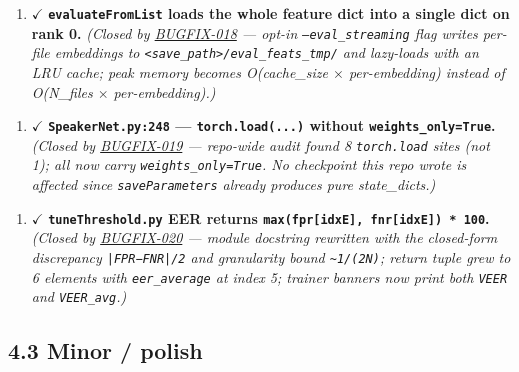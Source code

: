 \documentclass[10pt,a4paper]{article}
\begin{document}
\begin{enumerate}[leftmargin=*,itemsep=2pt]
  \item {\color{green!50!black}$\checkmark$} \textbf{\texttt{evaluateFromList} loads the whole feature dict into a single dict on rank 0.} \textit{(Closed by \href{docs/bugfixes/BUGFIX-018-streaming-evaluation.md}{BUGFIX-018} --- opt-in \texttt{--eval\_streaming} flag writes per-file embeddings to \texttt{<save\_path>/eval\_feats\_tmp/} and lazy-loads with an LRU cache; peak memory becomes O(cache\_size $\times$ per-embedding) instead of O(N\_files $\times$ per-embedding).)}
\end{enumerate}

\begin{enumerate}[leftmargin=*,itemsep=2pt]
  \item {\color{green!50!black}$\checkmark$} \textbf{\texttt{SpeakerNet.py:248} --- \texttt{torch.load(...)} without \texttt{weights\_only=True}.} \textit{(Closed by \href{docs/bugfixes/BUGFIX-019-torch-load-weights-only.md}{BUGFIX-019} --- repo-wide audit found 8 \texttt{torch.load} sites (not 1); all now carry \texttt{weights\_only=True}. No checkpoint this repo wrote is affected since \texttt{saveParameters} already produces pure state\_dicts.)}
\end{enumerate}

\begin{enumerate}[leftmargin=*,itemsep=2pt]
  \item {\color{green!50!black}$\checkmark$} \textbf{\texttt{tuneThreshold.py} EER returns \texttt{max(fpr[idxE], fnr[idxE]) * 100}.} \textit{(Closed by \href{docs/bugfixes/BUGFIX-020-eer-definition-disclosure.md}{BUGFIX-020} --- module docstring rewritten with the closed-form discrepancy \texttt{|FPR−FNR|/2} and granularity bound \texttt{\textasciitilde{}1/(2N)}; return tuple grew to 6 elements with \texttt{eer\_average} at index 5; trainer banners now print both \texttt{VEER} and \texttt{VEER\_avg}.)}
\end{enumerate}

\subsection*{4.3 Minor / polish}
\end{document}
